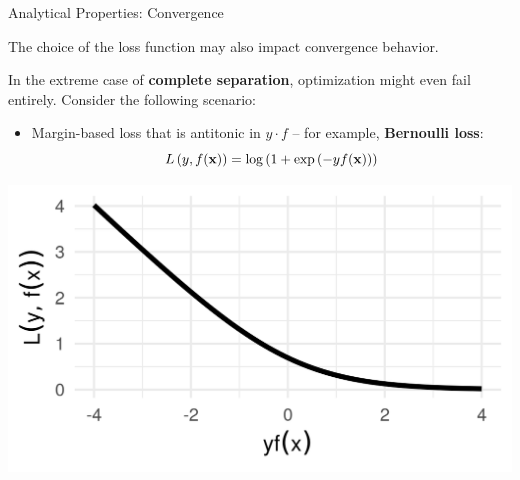 \documentclass[11pt,compress,t,notes=noshow, xcolor=table]{beamer}
\begin{document}



\begin{vbframe}{Analytical Properties: Convergence}

\small
The choice of the loss function may also impact convergence behavior.

\vspace{0.2cm}

In the extreme case of \textbf{complete separation}, optimization might even 
fail entirely. Consider the following scenario:

\vspace{0.5cm}

\begin{minipage}{0.7\textwidth}
  \begin{itemize}
    \small
    \item Margin-based loss that is antitonic in
    $y \cdot f$ -- for example, \textbf{Bernoulli loss}: 
    $$L\left(y, f(\mathbf{x})\right) = \log \left( 1 + \exp \left( - y  f(\mathbf{x}) \right)\right)$$
  \end{itemize}
\end{minipage}%
\begin{minipage}{0.05\textwidth}
  \phantom{foo}
\end{minipage}%
\begin{minipage}{0.25\textwidth}
  \includegraphics[width=\textwidth]{figure/plot_bernoulli}
\end{minipage}%

\vspace{0.3cm}


\end{vbframe}
\end{document}
